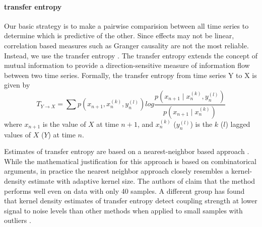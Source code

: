 \paragraph{transfer entropy}
Our basic strategy is to make a pairwise comparision between all time series to determine which is predictive of the other. 
Since effects may not be linear, correlation based measures such as Granger causality are not the most reliable. 
Instead, we use the transfer entropy \cite{Schreiber2000}. 
The transfer entropy extends the concept of mutual information to provide a direction-sensitive measure of information flow between two time series.
Formally, the transfer entropy from time series Y to X is given by
\begin{equation}
T_{Y \rightarrow X} = \sum p(x_{n+1},x_n^{(k)},y_n^{(l)}) log 
\frac{p(x_{n+1} \mid x_n^{(k)}, y_n^{(l)})}{p(x_{n+1} \mid x_n^{(k)})}
\end{equation}
where $x_{n+1}$ is the value of $X$ at time $n+1$, and $x_n^{(k)}$ ($y_n^{(l)}$) is the $k$ ($l$) lagged values of $X$ ($Y$) at time $n$.


Estimates of transfer entropy are based on a nearest-neighbor based approach \cite{Kraskov2004}. While the mathematical justification for this approach is based on combinatorical arguments, in practice the nearest neighbor approach closely resembles a kernel-density estimate with adaptive kernel size.
The authors of \cite{Kraskov2004} claim that the method performs well even on data with only 40 samples. 
A different group has found that kernel density estimates of transfer entropy detect coupling strength at lower signal to noise levels than other methods when applied to small samples with outliers \cite{Lee2012}.

